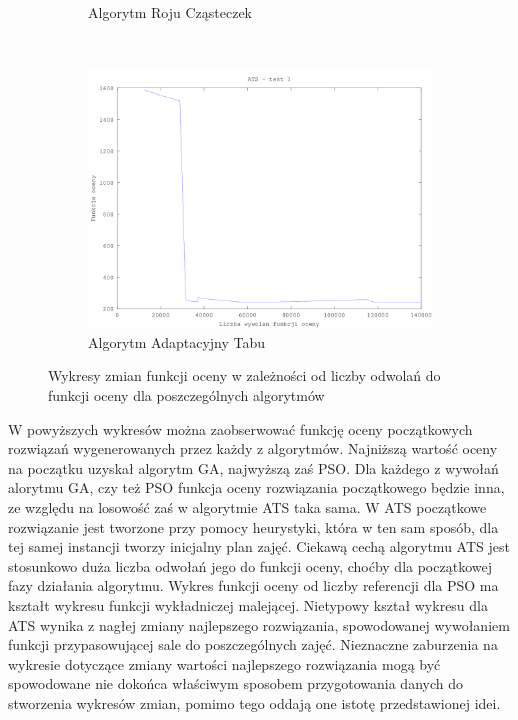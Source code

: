 \begin{figure}[H]
\begin{subfigure}[b]{0.5\textwidth}
                \caption{Algorytm Roju Cząsteczek}
        \end{subfigure}
        ~ %
          \\
        \begin{subfigure}[b]{0.5\textwidth}
                \includegraphics[width=\textwidth]{ats_test_1.png}
                \caption{Algorytm Adaptacyjny Tabu}
        \end{subfigure}
        \caption{Wykresy zmian funkcji oceny w zależności od liczby odwolań do funkcji oceny dla poszczególnych algorytmów}
\end{figure}

W powyższych wykresów można zaobserwować funkcję oceny początkowych rozwiązań wygenerowanych przez każdy z algorytmów. Najniższą wartość oceny na początku uzyskał algorytm GA, najwyższą zaś PSO. Dla każdego z wywołań alorytmu GA, czy też PSO funkcja oceny rozwiązania początkowego będzie inna, ze względu na losowość zaś w algorytmie ATS taka sama. W ATS początkowe rozwiązanie jest tworzone przy pomocy heurystyki, która w ten sam sposób, dla tej samej instancji tworzy inicjalny plan zajęć. Ciekawą cechą algorytmu ATS jest stosunkowo duża liczba odwołań jego do funkcji oceny, choćby dla początkowej fazy działania algorytmu. Wykres funkcji oceny od liczby referencji dla PSO ma kształt wykresu funkcji wykładniczej malejącej. Nietypowy kształ wykresu dla ATS wynika z nagłej zmiany najlepszego rozwiązania, spowodowanej wywołaniem funkcji przypasowującej sale do poszczególnych zajęć. Nieznaczne zaburzenia na wykresie dotyczące zmiany wartości najlepszego rozwiązania mogą być spowodowane nie dokońca właściwym sposobem przygotowania danych do stworzenia wykresów zmian, pomimo tego oddają one istotę przedstawionej idei.
